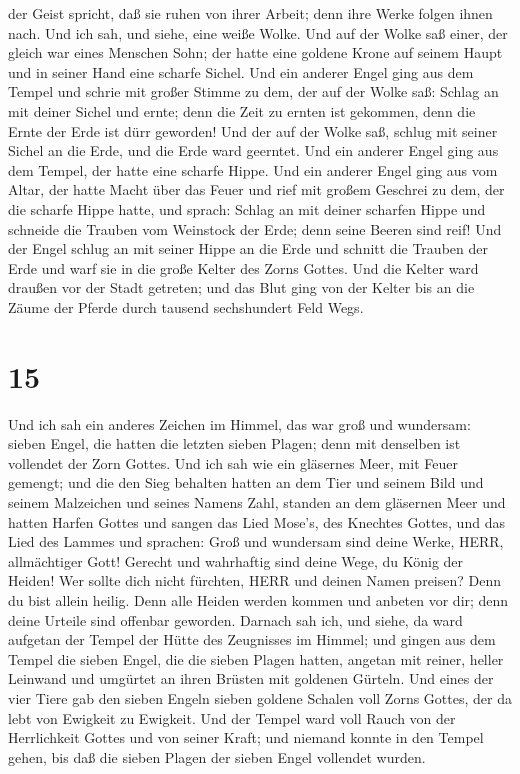 der Geist spricht, daß sie ruhen von ihrer Arbeit; denn ihre Werke
folgen ihnen nach.  Und ich sah, und siehe, eine weiße
Wolke. Und auf der Wolke saß einer, der gleich war eines Menschen Sohn;
der hatte eine goldene Krone auf seinem Haupt und in seiner Hand eine
scharfe Sichel.  Und ein anderer Engel ging aus dem Tempel
und schrie mit großer Stimme zu dem, der auf der Wolke saß: Schlag an
mit deiner Sichel und ernte; denn die Zeit zu ernten ist gekommen, denn
die Ernte der Erde ist dürr geworden!  Und der auf der
Wolke saß, schlug mit seiner Sichel an die Erde, und die Erde ward
geerntet.  Und ein anderer Engel ging aus dem Tempel, der
hatte eine scharfe Hippe.  Und ein anderer Engel ging aus
vom Altar, der hatte Macht über das Feuer und rief mit großem Geschrei
zu dem, der die scharfe Hippe hatte, und sprach: Schlag an mit deiner
scharfen Hippe und schneide die Trauben vom Weinstock der Erde; denn
seine Beeren sind reif!  Und der Engel schlug an mit seiner
Hippe an die Erde und schnitt die Trauben der Erde und warf sie in die
große Kelter des Zorns Gottes.  Und die Kelter ward draußen
vor der Stadt getreten; und das Blut ging von der Kelter bis an die
Zäume der Pferde durch tausend sechshundert Feld Wegs.

\hypertarget{section-14}{%
\section{15}\label{section-14}}

 Und ich sah ein anderes Zeichen im Himmel, das war groß und
wundersam: sieben Engel, die hatten die letzten sieben Plagen; denn mit
denselben ist vollendet der Zorn Gottes.  Und ich sah wie
ein gläsernes Meer, mit Feuer gemengt; und die den Sieg behalten hatten
an dem Tier und seinem Bild und seinem Malzeichen und seines Namens
Zahl, standen an dem gläsernen Meer und hatten Harfen Gottes
 und sangen das Lied Mose's, des Knechtes Gottes, und das
Lied des Lammes und sprachen: Groß und wundersam sind deine Werke, HERR,
allmächtiger Gott! Gerecht und wahrhaftig sind deine Wege, du König der
Heiden!  Wer sollte dich nicht fürchten, HERR und deinen
Namen preisen? Denn du bist allein heilig. Denn alle Heiden werden
kommen und anbeten vor dir; denn deine Urteile sind offenbar geworden.
 Darnach sah ich, und siehe, da ward aufgetan der Tempel der
Hütte des Zeugnisses im Himmel;  und gingen aus dem Tempel
die sieben Engel, die die sieben Plagen hatten, angetan mit reiner,
heller Leinwand und umgürtet an ihren Brüsten mit goldenen Gürteln.
 Und eines der vier Tiere gab den sieben Engeln sieben
goldene Schalen voll Zorns Gottes, der da lebt von Ewigkeit zu Ewigkeit.
 Und der Tempel ward voll Rauch von der Herrlichkeit Gottes
und von seiner Kraft; und niemand konnte in den Tempel gehen, bis daß
die sieben Plagen der sieben Engel vollendet wurden.

